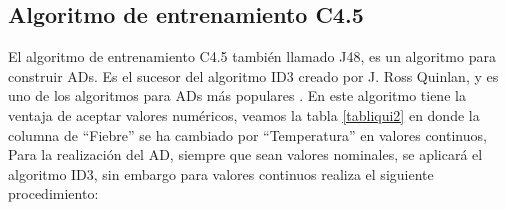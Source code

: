\documentclass[twoside,spanish,ESP,MSc]{plantillaLabUPV}
\theoremstyle{definition}
\begin{document}
\subsection{Algoritmo de entrenamiento C4.5}

El algoritmo de entrenamiento C4.5 también llamado J48, es un algoritmo para construir ADs. Es el sucesor del algoritmo ID3 creado por J. Ross Quinlan, y es uno de los algoritmos para ADs más populares \cite{c45salz}. 
En este algoritmo tiene la ventaja de aceptar valores numéricos, veamos la tabla \ref{tabliqui2} en donde la columna de ``Fiebre'' se ha cambiado por ``Temperatura'' en valores continuos, Para la realización del AD, siempre que sean valores nominales, se aplicará el algoritmo ID3, sin embargo para valores continuos realiza el siguiente procedimiento:
\end{document}
